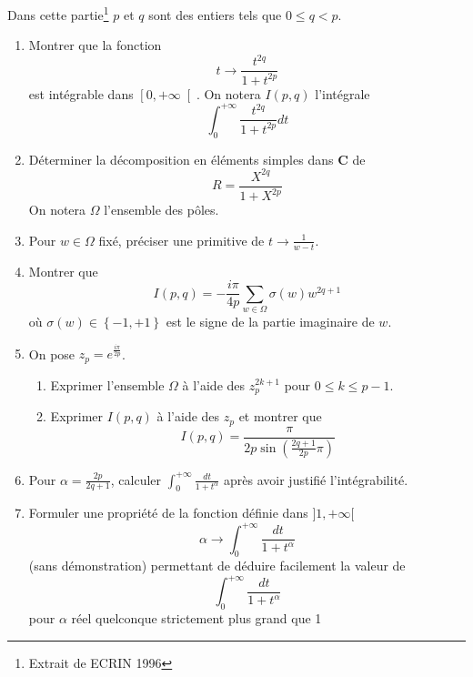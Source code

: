 Dans cette partie\footnote{Extrait de ECRIN 1996} $p$ et $q$ sont des entiers tels que $0\leq q<p$.
\begin{enumerate}
\item  Montrer que la fonction 
\[t\rightarrow \frac{t^{2q}}{1+t^{2p}}\]
 est
int\'{e}grable dans $\left[ 0,+\infty \right[ $. On notera $I(p,q)$
l'int\'{e}grale 
\[\int_{0}^{+\infty }\frac{t^{2q}}{1+t^{2p}}dt\]
\item  D\'{e}terminer la d\'{e}composition en \'{e}l\'{e}ments simples dans $%
\mathbf{C}$ de 
\[
R=\frac{X^{2q}}{1+X^{2p}}
\]
On notera $\Omega $ l'ensemble des p\^{o}les.

\item  Pour $w\in \Omega $ fix\'{e}, pr\'{e}ciser une primitive de $%
t\rightarrow \frac{1}{w-t}$.

\item  Montrer que 
\[
I(p,q)=-\frac{i\pi }{4p}\sum_{w\in \Omega }\sigma (w)w^{2q+1}
\]
o\`{u} $\sigma (w)\in \left\{ -1,+1\right\} $ est le signe de la partie
imaginaire de $w$.

\item  On pose $z_{p}=e^{\frac{i\pi }{2p}}$.

\begin{enumerate}
\item  Exprimer l'ensemble $\Omega$  à l'aide des $z_p^{2k+1}$ pour
$0\leq k \leq p-1$.
\item  Exprimer $I(p,q)$ \`{a} l'aide des $z_{p}$ et montrer que 
\[
I(p,q)=\frac{\pi }{2p\sin \left( \frac{2q+1}{2p}\pi \right) } 
\]
\end{enumerate}

\item  Pour $\alpha =\frac{2p}{2q+1}$, calculer $\int_{0}^{+\infty }\frac{dt%
}{1+t^{\alpha }}$ apr\`{e}s avoir justifi\'{e} l'int\'{e}grabilit\'{e}.

\item  Formuler une propri\'{e}t\'{e} de la fonction définie dans $ ] 1,+\infty
[$
\[\alpha \rightarrow \int_{0}^{+\infty }\frac{dt}{1+t^{\alpha }}\]
(sans d\'{e}monstration) permettant de d\'{e}duire
facilement la valeur de 
\[\int_{0}^{+\infty }\frac{dt}{1+t^{\alpha }}\]
pour $\alpha $ r\'{e}el quelconque strictement plus grand que 1
\end{enumerate}

